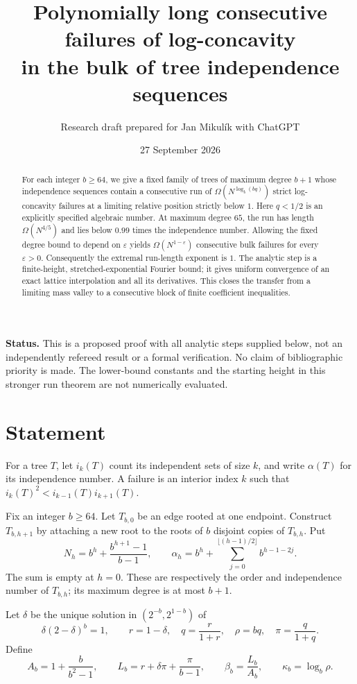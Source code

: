 \documentclass[11pt]{article}
\title{Polynomially long consecutive failures of log-concavity\\in the bulk of tree independence sequences}
\author{Research draft prepared for Jan Mikul\'ik with ChatGPT}
\date{27 September 2026}
\begin{document}
\maketitle
\begin{abstract}
For each integer $b\ge64$, we give a fixed family of trees of maximum
degree $b+1$ whose independence sequences contain a consecutive run of
$\Omega(N^{\log_b(bq)})$ strict log-concavity failures at a limiting
relative position strictly below $1$. Here $q<1/2$ is an explicitly
specified algebraic number. At maximum degree $65$, the run has length
$\Omega(N^{4/5})$ and lies below $0.99$ times the independence number.
Allowing the fixed degree bound to depend on $\varepsilon$ yields
$\Omega(N^{1-\varepsilon})$ consecutive bulk failures for every
$\varepsilon>0$. Consequently the extremal run-length exponent is $1$.
The analytic step is a finite-height, stretched-exponential Fourier bound;
it gives uniform convergence of an exact lattice interpolation and all its
derivatives. This closes the transfer from a limiting mass valley to a
consecutive block of finite coefficient inequalities.
\end{abstract}

\noindent\textbf{Status.} This is a proposed proof with all analytic steps
supplied below, not an independently refereed result or a formal
verification. No claim of bibliographic priority is made. The lower-bound
constants and the starting height in this stronger run theorem are not
numerically evaluated.

\section{Statement}
For a tree $T$, let $i_k(T)$ count its independent sets of size $k$, and
write $\alpha(T)$ for its independence number. A failure is an interior
index $k$ such that $i_k(T)^2<i_{k-1}(T)i_{k+1}(T)$.

Fix an integer $b\ge64$. Let $T_{b,0}$ be an edge rooted at one endpoint.
Construct $T_{b,h+1}$ by attaching a new root to the roots of $b$ disjoint
copies of $T_{b,h}$. Put
\begin{equation}\label{eq:size}
 N_h=b^h+\frac{b^{h+1}-1}{b-1},\qquad
 \alpha_h=b^h+\sum_{j=0}^{\lfloor(h-1)/2\rfloor}b^{h-1-2j}.
\end{equation}
The sum is empty at $h=0$. These are respectively the order and
independence number of $T_{b,h}$; its maximum degree is at most $b+1$.

Let $\delta$ be the unique solution in $(2^{-b},2^{1-b})$ of
\begin{equation}\label{eq:parameters}
 \delta(2-\delta)^b=1,
 \qquad r=1-\delta,\quad q=\frac{r}{1+r},\quad \rho=bq,
 \quad \pi=\frac{q}{1+q}.
\end{equation}
Define
\begin{equation}\label{eq:beta}
 A_b=1+\frac{b}{b^2-1},\qquad
 L_b=r+\delta\pi+\frac{\pi}{b-1},\qquad
 \beta_b=\frac{L_b}{A_b},\qquad \kappa_b=\log_b\rho.
\end{equation}
\end{document}
